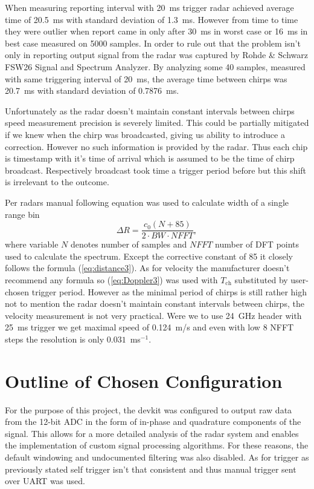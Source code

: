 When measuring reporting interval with 20~ms trigger radar achieved average time of 20.5~ms with standard deviation of 1.3~ms.
However from time to time they were outlier when report came in only after 30~ms in worst case or 16~ms in best case measured on 5000 samples.
In order to rule out that the problem isn't only in reporting output signal from the radar was captured by Rohde \& Schwarz FSW26 Signal and Spectrum Analyzer.
By analyzing some 40 samples, measured with same triggering interval of 20~ms, the average time between chirps was 20.7~ms with standard deviation of 0.7876~ms.

Unfortunately as the radar doesn't maintain constant intervals between chirps speed measurement precision is severely limited.
This could be partially mitigated if we knew when the chirp was broadcasted, giving us ability to introduce a correction.
However no such information is provided by the radar.
Thus each chip is timestamp with it's time of arrival which is assumed to be the time of chirp broadcast.
Respectively broadcast took time a trigger period before but this shift is irrelevant to the outcome.

Per radars manual \cite{sidarPRO} following equation was used to calculate width of a single range bin
\begin{equation}
  \Delta R = \frac{c_0 (N+85)}{2\cdot BW\cdot NFFT},
  \label{eq:rangeBin}
\end{equation}
where variable $N$ denotes number of samples and $NFFT$ number of DFT points used to calculate the spectrum.
Except the corrective constant of 85 it closely follows the formula (\ref{eq:distance3}).
As for velocity the manufacturer doesn't recommend any formula so (\ref{eq:Doppler3}) was used with $T_\mathrm{ch}$ substituted by user-chosen trigger period.
However as the minimal period of chirps is still rather high not to mention the radar doesn't maintain constant intervals between chirps, the velocity measurement is not very practical.
Were we to use 24~GHz header with 25~ms trigger we get maximal speed of 0.124~m/s and even with low 8 NFFT steps the resolution is only $0.031$~ms$^{-1}$.

\section{Outline of Chosen Configuration }


For the purpose of this project, the devkit was configured to output raw data from the 12-bit ADC in the form of in-phase and quadrature components of the signal.
This allows for a more detailed analysis of the radar system and enables the implementation of custom signal processing algorithms.
For these reasons, the default windowing and undocumented filtering was also disabled.
As for trigger as previously stated self trigger isn't that consistent and thus manual trigger sent over UART was used.

